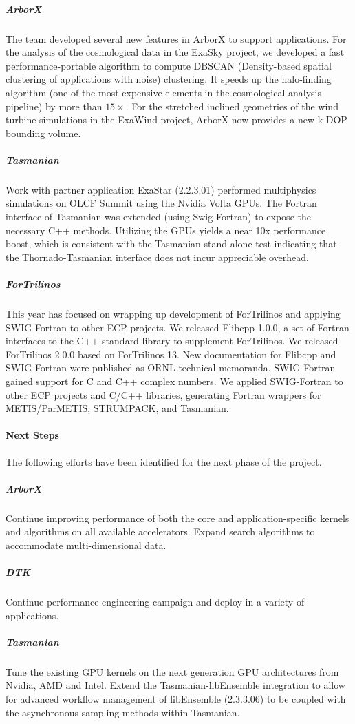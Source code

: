 \subparagraph{ArborX} The team developed several new features in ArborX to support
applications. For the analysis of the cosmological data in the ExaSky
project, we developed a fast performance-portable algorithm to compute DBSCAN
(Density-based spatial clustering of applications with noise) clustering. It
speeds up the halo-finding algorithm (one of the most expensive elements in the
cosmological analysis pipeline) by more than $15\times$. For the stretched
inclined geometries of the wind turbine simulations in the ExaWind project,
ArborX now provides a new k-DOP bounding volume.

\subparagraph{Tasmanian} Work with partner application ExaStar (2.2.3.01) performed
multiphysics simulations on OLCF Summit using the Nvidia Volta GPUs.
The Fortran interface of Tasmanian was extended (using Swig-Fortran)
to expose the necessary C++ methods. Utilizing the GPUs yields a near 10x
performance boost, which is consistent with the Tasmanian stand-alone test
indicating that the Thornado-Tasmanian interface does not incur appreciable
overhead.

\subparagraph{ForTrilinos} This year has focused on wrapping up development of
ForTrilinos and applying SWIG-Fortran to other ECP projects. We released Flibcpp
1.0.0, a set of Fortran interfaces to the C++ standard library to supplement
ForTrilinos. We released ForTrilinos 2.0.0 based on ForTrilinos 13. New
documentation for Flibcpp and SWIG-Fortran were published as ORNL technical
memoranda. SWIG-Fortran gained support for C and C++ complex numbers.
We applied SWIG-Fortran to other ECP projects and C/C++ libraries, generating
Fortran wrappers for METIS/ParMETIS, STRUMPACK, and Tasmanian.


\paragraph{Next Steps}
The following efforts have been identified for the next phase of the project.

\subparagraph{ArborX} Continue improving performance of both the core and
application-specific kernels and algorithms on all available accelerators.
Expand search algorithms to accommodate multi-dimensional data.

\subparagraph{DTK} Continue performance engineering campaign and deploy in a variety of
applications.

\subparagraph{Tasmanian} Tune the existing GPU kernels on the next generation
GPU architectures from Nvidia, AMD and Intel.
Extend the Tasmanian-libEnsemble integration to allow for advanced workflow
management of libEnsemble (2.3.3.06) to be coupled with the asynchronous sampling
methods within Tasmanian.

